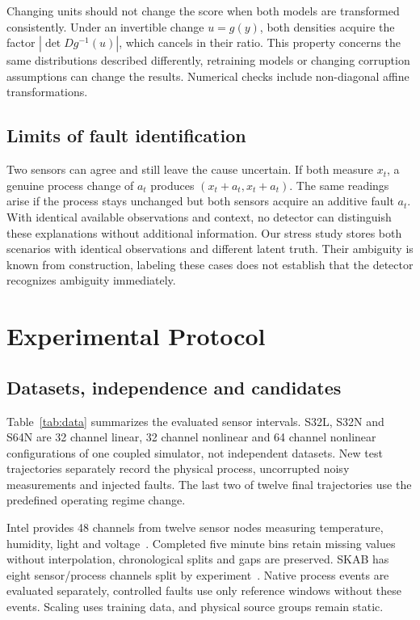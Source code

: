 \documentclass{llncs}
\newcommand{\1}{\mathbf{1}}
\begin{document}
Changing units should not change the score when both models are transformed consistently. Under an invertible change $u=g(y)$, both densities acquire the factor $|\det Dg^{-1}(u)|$, which cancels in their ratio. This property concerns the same distributions described differently, retraining models or changing corruption assumptions can change the results. Numerical checks include non-diagonal affine transformations.

\subsection{Limits of fault identification}
Two sensors can agree and still leave the cause uncertain. If both measure $x_t$, a genuine process change of $a_t$ produces $(x_t+a_t,x_t+a_t)$. The same readings arise if the process stays unchanged but both sensors acquire an additive fault $a_t$. With identical available observations and context, no detector can distinguish these explanations without additional information. Our stress study stores both scenarios with identical observations and different latent truth. Their ambiguity is known from construction, labeling these cases does not establish that the detector recognizes ambiguity immediately.







\section{Experimental Protocol}

\subsection{Datasets, independence and candidates}
Table~\ref{tab:data} summarizes the evaluated sensor intervals. S32L, S32N and S64N are 32 channel linear, 32 channel nonlinear and 64 channel nonlinear configurations of one coupled simulator, not independent datasets. New test trajectories separately record the physical process, uncorrupted noisy measurements and injected faults. The last two of twelve final trajectories use the predefined operating regime change.

Intel provides 48 channels from twelve sensor nodes measuring temperature, humidity, light and voltage~\cite{intel}. Completed five minute bins retain missing values without interpolation, chronological splits and gaps are preserved. SKAB has eight sensor/process channels split by experiment~\cite{skab}. Native process events are evaluated separately, controlled faults use only reference windows without these events. Scaling uses training data, and physical source groups remain static.
\end{document}
